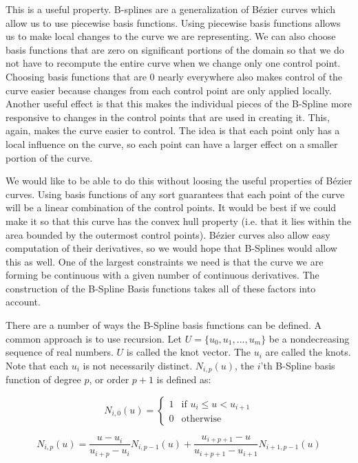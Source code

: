 This is a useful property.
B-splines are a generalization of B\'{e}zier curves which allow us to use piecewise basis functions.
Using piecewise basis functions allows us to make local changes to the curve we are representing.
We can also choose basis functions that are zero on significant portions of the domain so that we do not have to recompute the entire curve when we change only one control point.
Choosing basis functions that are 0 nearly everywhere also makes control of the curve easier because changes from each control point are only applied locally.
Another useful effect is that this makes the individual pieces of the B-Spline more responsive to changes in the control points that are used in creating it.
This, again, makes the curve easier to control.
The idea is that each point only has a local influence on the curve, so each point can have a larger effect on a smaller portion of the curve.

We would like to be able to do this without loosing the useful properties of B\'{e}zier curves.
Using basis functions of any sort guarantees that each point of the curve will be a linear combination of the control points.
It would be best if we could make it so that this curve has the convex hull property (i.e. that it lies within the area bounded by the outermost control points).
B\'{e}zier curves also allow easy computation of their derivatives, so we would hope that B-Splines would allow this as well.
One of the largest constraints we need is that the curve we are forming be continuous with a given number of continuous derivatives.
The construction of the B-Spline Basis functions takes all of these factors into account.

There are a number of ways the B-Spline basis functions can be defined.
A common approach is to use recursion.
Let $U = \lbrace u_0, u_1, ... , u_m \rbrace$ be a nondecreasing sequence of real numbers.
$U$ is called the knot vector.
The $u_i$ are called the knots.
Note that each $u_i$ is not necessarily distinct.
$N_{i,p}(u)$, the $i$'th B-Spline basis function of degree $p$, or order $p+1$ is defined as:

\begin{equation}
N_{i,0}(u) =
\begin{cases}
1 & \text{if } u_i \leq u < u_{i+1} \\
0 & \text{otherwise}
\end{cases}
\end{equation}

\begin{equation}
N_{i,p}(u) = \frac{u - u_i}{u_{i+p} - u_i} N_{i,p-1}(u) + \frac{u_{i + p + 1} - u}{u_{i + p + 1} - u_{i + 1}} N_{i+1,p-1}(u)
\end{equation}

